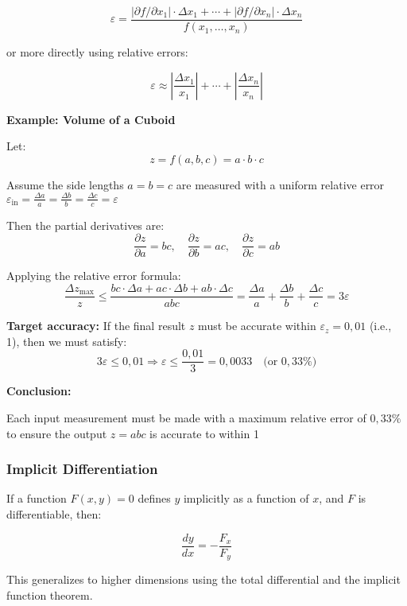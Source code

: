 \[
\varepsilon = \frac{|\partial f / \partial x_1| \cdot \Delta x_1 + \cdots + |\partial f / \partial x_n| \cdot \Delta x_n}{f(x_1, \dots, x_n)}
\]

or more directly using relative errors:

\[
\varepsilon \approx \left| \frac{\Delta x_1}{x_1} \right| + \cdots + \left| \frac{\Delta x_n}{x_n} \right|
\]

\textbf{Example: Volume of a Cuboid}
\vspace{\baselineskip}

Let:
\[
z = f(a, b, c) = a \cdot b \cdot c
\]

Assume the side lengths \( a = b = c \) are measured with a uniform relative error \( \varepsilon_{\text{in}} = \frac{\Delta a}{a} = \frac{\Delta b}{b} = \frac{\Delta c}{c} = \varepsilon \)

Then the partial derivatives are:
\[
\frac{\partial z}{\partial a} = b c, \quad
\frac{\partial z}{\partial b} = a c, \quad
\frac{\partial z}{\partial c} = a b
\]

Applying the relative error formula:
\[
\frac{\Delta z_{\max}}{z} \leq \frac{bc \cdot \Delta a + ac \cdot \Delta b + ab \cdot \Delta c}{abc}
= \frac{\Delta a}{a} + \frac{\Delta b}{b} + \frac{\Delta c}{c} = 3 \varepsilon
\]

\textbf{Target accuracy:}  
If the final result \( z \) must be accurate within \( \varepsilon_z = 0{,}01 \) (i.e., 1), then we must satisfy:
\[
3 \varepsilon \leq 0{,}01 \Rightarrow \varepsilon \leq \frac{0{,}01}{3} = \boxed{0{,}0033} \quad \text{(or } 0{,}33\% \text{)}
\]

\textbf{Conclusion:}
\vspace{\baselineskip}

Each input measurement must be made with a maximum relative error of \( \boxed{0{,}33\%} \) to ensure the output \( z = abc \) is accurate to within 1%

\subsubsection{Implicit Differentiation}

If a function \( F(x, y) = 0 \) defines \( y \) implicitly as a function of \( x \), and \( F \) is differentiable, then:

\[
\frac{dy}{dx} = -\frac{F_x}{F_y}
\]

This generalizes to higher dimensions using the total differential and the implicit function theorem.


